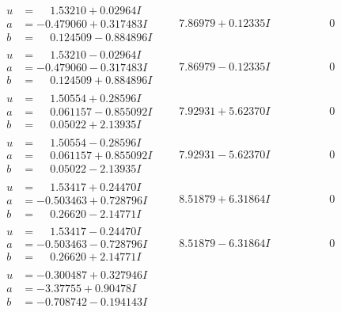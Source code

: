 \documentclass[1p]{elsarticle_modified}
\theoremstyle{definition}
\begin{document}
$$\begin{array}{c|c|c}
\begin{aligned}
u &= \phantom{-}1.53210 + 0.02964 I \\
a &= -0.479060 + 0.317483 I \\
b &= \phantom{-}0.124509 - 0.884896 I\end{aligned}
 & \phantom{-}7.86979 + 0.12335 I & \phantom{-0.000000 } 0 \\ \hline\begin{aligned}
u &= \phantom{-}1.53210 - 0.02964 I \\
a &= -0.479060 - 0.317483 I \\
b &= \phantom{-}0.124509 + 0.884896 I\end{aligned}
 & \phantom{-}7.86979 - 0.12335 I & \phantom{-0.000000 } 0 \\ \hline\begin{aligned}
u &= \phantom{-}1.50554 + 0.28596 I \\
a &= \phantom{-}0.061157 - 0.855092 I \\
b &= \phantom{-}0.05022 + 2.13935 I\end{aligned}
 & \phantom{-}7.92931 + 5.62370 I & \phantom{-0.000000 } 0 \\ \hline\begin{aligned}
u &= \phantom{-}1.50554 - 0.28596 I \\
a &= \phantom{-}0.061157 + 0.855092 I \\
b &= \phantom{-}0.05022 - 2.13935 I\end{aligned}
 & \phantom{-}7.92931 - 5.62370 I & \phantom{-0.000000 } 0 \\ \hline\begin{aligned}
u &= \phantom{-}1.53417 + 0.24470 I \\
a &= -0.503463 + 0.728796 I \\
b &= \phantom{-}0.26620 - 2.14771 I\end{aligned}
 & \phantom{-}8.51879 + 6.31864 I & \phantom{-0.000000 } 0 \\ \hline\begin{aligned}
u &= \phantom{-}1.53417 - 0.24470 I \\
a &= -0.503463 - 0.728796 I \\
b &= \phantom{-}0.26620 + 2.14771 I\end{aligned}
 & \phantom{-}8.51879 - 6.31864 I & \phantom{-0.000000 } 0 \\ \hline\begin{aligned}
u &= -0.300487 + 0.327946 I \\
a &= -3.37755 + 0.90478 I \\
b &= -0.708742 - 0.194143 I\end{aligned}

\end{array}$$
\end{document}
